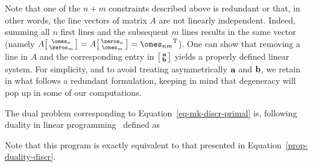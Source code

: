 \begin{rem}\label{rem-transportation-polytope} Note that one of the $n+m$ constraints described above is redundant or that, in other words, the line vectors of matrix $A$ are not linearly independent. Indeed, summing all $n$ first lines and the subsequent $m$ lines results in the same vector (namely $A \bigl[\begin{smallmatrix} \ones_n\\\zeros_m \end{smallmatrix}\bigr] = A \bigl[\begin{smallmatrix} \zeros_n\\\ones_m\end{smallmatrix}\bigr]=\transp{\ones_{nm}}$). One can show that removing a line in $A$ and the corresponding entry in $\bigl[\begin{smallmatrix}\mathrm{\textbf{a}}\\ \mathrm{\textbf{b}} \end{smallmatrix}\bigr]$ yields a properly defined linear system. For simplicity, and to avoid treating asymmetrically $\mathrm{\textbf{a}}$ and $\mathrm{\textbf{b}}$, we retain in what follows a redundant formulation, keeping in mind that degeneracy will pop up in some of our computations.\end{rem}

The dual problem corresponding to Equation~\eqref{eq-mk-discr-primal} is, following duality in linear programming~\citep[p. 143]{bertsimas1997introduction} defined as

Note that this program is exactly equivalent to that presented in Equation~\eqref{prop-duality-discr}.


